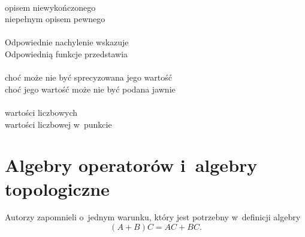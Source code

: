 \documentclass[a4paper,11pt]{article}
\begin{document}
\noi
{} \\
\Jest opisem niewykończonego \\
\Pow niepełnym opisem pewnego \\
 \\
\Jest Odpowiednie nachylenie wskazuje \\
\Pow Odpowiednią funkcje przedstawia \\
 \\
\Jest choć może nie być sprecyzowana jego wartość \\
\Pow choć jego wartość może nie być podana jawnie \\
 \\
\Jest wartości liczbowych \\
\Pow wartości liczbowej w~punkcie \\

\vspace{\spaceTwo}





\section{Algebry operatorów i~algebry topologiczne}

\vspace{\spaceTwo}





\start {} Autorzy zapomnieli o~jednym warunku, który jest
potrzebny w~definicji algebry
\begin{equation}
  \label{eq:BR-s01-01}
  ( A + B ) C = A C + B C.
\end{equation}

\vspace{\spaceFour}
\end{document}

